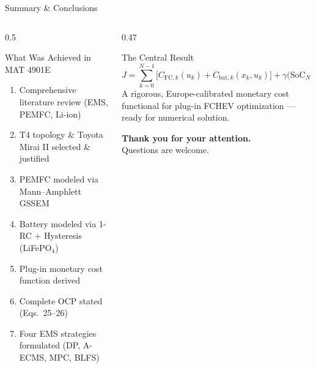 \documentclass[aspectratio=169, 10pt]{beamer}
\newcommand{\SoC}{\mathrm{SoC}}
\begin{document}
\begin{frame}{Summary \& Conclusions}
  \begin{columns}[T]
    \begin{column}{0.5\textwidth}
      \begin{block}{What Was Achieved in MAT 4901E}
        \begin{enumerate}
          \item[$\checkmark$] Comprehensive literature review (EMS, PEMFC, Li-ion)
          \item[$\checkmark$] T4 topology \& Toyota Mirai II selected \& justified
          \item[$\checkmark$] PEMFC modeled via Mann–Amphlett GSSEM
          \item[$\checkmark$] Battery modeled via 1-RC + Hysteresis (LiFePO$_4$)
          \item[$\checkmark$] Plug-in monetary cost function derived
          \item[$\checkmark$] Complete OCP stated (Eqs.\ 25–26)
          \item[$\checkmark$] Four EMS strategies formulated (DP, A-ECMS, MPC, BLFS)
        \end{enumerate}
      \end{block}
    \end{column}
    \begin{column}{0.47\textwidth}
      \begin{alertblock}{The Central Result}
        \[
          J = \sum_{k=0}^{N-1}\!\bigl[C_{\mathrm{FC},k}(u_k) + C_{\mathrm{bat},k}(x_k,u_k)\bigr]
              + \gamma\bigl(\SoC_N - \SoC_{\mathrm{tgt}}\bigr)^2
        \]
        A rigorous, Europe-calibrated monetary cost functional for plug-in FCHEV optimization — ready for numerical solution.
      \end{alertblock}
      \vspace{8pt}
      \begin{center}
        \large\textbf{Thank you for your attention.}\\[8pt]
        \normalsize Questions are welcome.
      \end{center}
    \end{column}
  \end{columns}
\end{frame}
\end{document}
